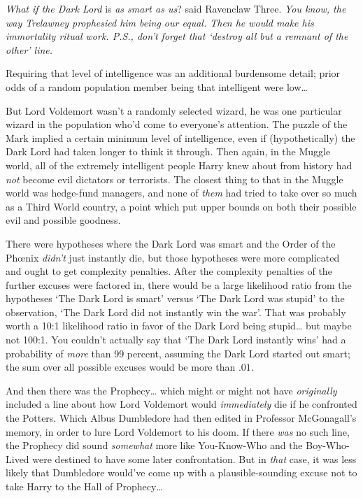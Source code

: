 \emph{What if the Dark Lord} is \emph{as smart as us}? said Ravenclaw Three. \emph{You know, the way Trelawney prophesied him being our \emph{equal}. Then he would \emph{make} his immortality ritual work. P.S., don't forget that `destroy all but a remnant of the other' line.}

Requiring that level of intelligence was an additional burdensome detail; prior odds of a random population member being that intelligent were low{\ldots}

But Lord Voldemort wasn't a randomly selected wizard, he was one particular wizard in the population who'd come to everyone's attention. The puzzle of the Mark implied a certain minimum level of intelligence, even if (hypothetically) the Dark Lord had taken longer to think it through. Then again, in the Muggle world, all of the extremely intelligent people Harry knew about from history had \emph{not} become evil dictators or terrorists. The closest thing to that in the Muggle world was hedge-fund managers, and none of \emph{them} had tried to take over so much as a Third World country, a point which put upper bounds on both their possible evil and possible goodness.

There were hypotheses where the Dark Lord was smart and the Order of the Phœnix \emph{didn't} just instantly die, but those hypotheses were more complicated and ought to get complexity penalties. After the complexity penalties of the further excuses were factored in, there would be a large likelihood ratio from the hypotheses `The Dark Lord is smart' versus `The Dark Lord was stupid' to the observation, `The Dark Lord did not instantly win the war'. That was probably worth a 10:1 likelihood ratio in favor of the Dark Lord being stupid{\ldots} but maybe not 100:1. You couldn't actually say that `The Dark Lord instantly wins' had a probability of \emph{more} than 99 percent, assuming the Dark Lord started out smart; the sum over all possible excuses would be more than $.01$.

And then there was the Prophecy{\ldots} which might or might not have \emph{originally} included a line about how Lord Voldemort would \emph{immediately} die if he confronted the Potters. Which Albus Dumbledore had then edited in Professor McGonagall's memory, in order to lure Lord Voldemort to his doom. If there \emph{was} no such line, the Prophecy did sound \emph{somewhat} more like You-Know-Who and the Boy-Who-Lived were destined to have some later confrontation. But in \emph{that} case, it was less likely that Dumbledore would've come up with a plausible-sounding excuse not to take Harry to the Hall of Prophecy{\ldots}

